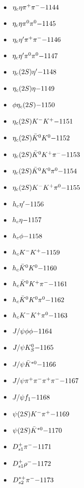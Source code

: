 \begin{multicols}{3}
\begin{itemize}
 \item $ \eta_{c} \eta \pi^{+} \pi^{-} \hfill{-1144}$
 \item $ \eta_{c} \eta \pi^{0} \pi^{0} \hfill{-1145}$
 \item $ \eta_{c} {\eta^{\prime}} \pi^{+} \pi^{-} \hfill{-1146}$
 \item $ \eta_{c} {\eta^{\prime}} \pi^{0} \pi^{0} \hfill{-1147}$
 \item $ \eta_{c}(2S) {\eta^{\prime}} \hfill{-1148}$
 \item $ \eta_{c}(2S) \eta \hfill{-1149}$
 \item $ \phi \eta_{c}(2S) \hfill{-1150}$
 \item $ \eta_{c}(2S) K^{-} K^{+} \hfill{-1151}$
 \item $ \eta_{c}(2S) \bar{K}^{0} K^{0} \hfill{-1152}$
 \item $ \eta_{c}(2S) \bar{K}^{0} K^{+} \pi^{-} \hfill{-1153}$
 \item $ \eta_{c}(2S) \bar{K}^{0} K^{0} \pi^{0} \hfill{-1154}$
 \item $ \eta_{c}(2S) K^{-} K^{+} \pi^{0} \hfill{-1155}$
 \item $ h_{c} {\eta^{\prime}} \hfill{-1156}$
 \item $ h_{c} \eta \hfill{-1157}$
 \item $ h_{c} \phi \hfill{-1158}$
 \item $ h_{c} K^{-} K^{+} \hfill{-1159}$
 \item $ h_{c} \bar{K}^{0} K^{0} \hfill{-1160}$
 \item $ h_{c} \bar{K}^{0} K^{+} \pi^{-} \hfill{-1161}$
 \item $ h_{c} \bar{K}^{0} K^{0} \pi^{0} \hfill{-1162}$
 \item $ h_{c} K^{-} K^{+} \pi^{0} \hfill{-1163}$
 \item $ J/\psi \phi \phi \hfill{-1164}$
 \item $ J/\psi K_{S}^{0} \hfill{-1165}$
 \item $ J/\psi \bar{K}^{*0} \hfill{-1166}$
 \item $ J/\psi \pi^{+} \pi^{-} \pi^{+} \pi^{-} \hfill{-1167}$
 \item $ J/\psi f_{1} \hfill{-1168}$
 \item $ \psi(2S) K^{-} \pi^{+} \hfill{-1169}$
 \item $ \psi(2S) \bar{K}^{*0} \hfill{-1170}$
 \item $ D_{s1}^{+} \pi^{-} \hfill{-1171}$
 \item $ D_{s1}^{+} \rho^{-} \hfill{-1172}$
 \item $ D_{s2}^{*+} \pi^{-} \hfill{-1173}$

\end{itemize}
\end{multicols}
